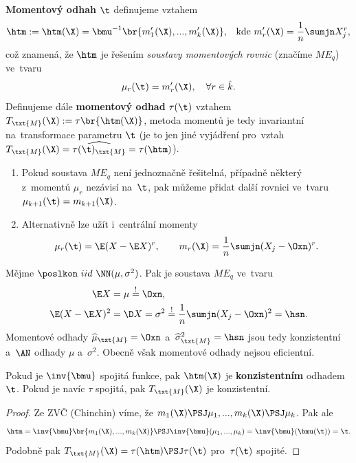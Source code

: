 \begin{define}
	\textbf{Momentový odhah} $\t$ definujeme vztahem
	$$ \htm:=\htm(\X)=\bmu^{-1}\br{m'_1(\X),...,m'_k(\X)}\text{,\quad  kde }m'_r(\X)=\frac{1}{n}\sumjn X_j^r, $$ což znamená, že $\htm$ je řešením \textit{soustavy momentových rovnic} (značíme $ME_q$) ve~tvaru $$\mu_r(\t)=m'_r(\X),\quad \forall r \in\hat{k}.$$ Definujeme dále \textbf{momentový odhad} $\tau(\t)$ vztahem $T_\txt{M}(\X):=\tau\br{\htm(\X)}$, metoda momentů je tedy invariantní na~transformace parametru $\t$ (je to jen jiné vyjádření pro~vztah\\ $T_\txt{M}(\X)=\widehat{\tau(\t)_\txt{M}}=\tau(\htm)$).
\end{define}
\begin{remark}
	\begin{enumerate}
		\item Pokud soustava $ME_q$ není jednoznačně řešitelná, případně některý z~momentů $\mu_r$ nezávisí na~$\t$, pak můžeme přidat další rovnici ve~tvaru $\mu_{k+1}(\t)=m_{k+1}(\X)$.
		\item Alternativně lze užít i~centrální momenty
		$$ \mu_r(\t)=\E(X-\E X)^r,\qquad m_r(\X)=\frac{1}{n}\sumjn (X_j-\Oxn)^r. $$
	\end{enumerate}
\end{remark}
\begin{example}
	Mějme $\poslkon~iid~\NN(\mu,\sigma^2)$. Pak je soustava $ME_q$ ve~tvaru \[
	\begin{split}
	\E X&=\mu\stackrel{!}{=}\Oxn, \\ \E(X-\E X)^2&=\D X=\sigma^2\stackrel{!}{=}\frac{1}{n}\sumjn (X_j-\Oxn)^2=\hsn.
	\end{split}
	\] Momentové odhady $\widehat{\mu}_\txt{M} = \Oxn$ a~$\widehat{\sigma}^2_\txt{M}=\hsn$ jsou tedy konzistentní a~$\AN$ odhady $\mu$ a~$\sigma^2$. Obecně však momentové odhady nejsou eficientní.
\end{example}
\begin{theorem}
	Pokud je $\inv{\bmu}$ spojitá funkce, pak $\htm(\X)$ je \textbf{konzistentním} odhadem $\t$. Pokud je navíc $\tau$ spojitá, pak $T_\txt{M}(\X)$ je konzistentní.
	\begin{proof}Ze ZVČ (Chinchin) víme, že 
		$m_1(\X)\PSJ\mu_1,...,m_k(\X)\PSJ\mu_k$. Pak ale
		$$
		\htm=\inv{\bmu}\br{m_1(\X),...,m_k(\X)}\PSJ\inv{\bmu}(\mu_1,...,\mu_k)=\inv{\bmu}(\bmu(\t))=\t.$$
		Podobně pak $T_\txt{M}(\X)=\tau(\htm)\PSJ\tau(\t)$ pro~$\tau(\t)$ spojité.
	\end{proof}
\end{theorem}

